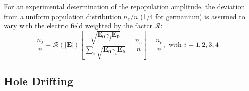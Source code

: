 For an experimental determination of the repopulation amplitude, the deviation from a uniform population distribution $n_{e}/n$ (1/4 for germanium) is assumed to vary with the electric field weighted by the factor $\mathcal{R}$:
\begin{equation}
  \label{eq:nion}
  \frac{n_{j}}{n} = \mathcal{R(|\mathbf{E}|)}   \left[         \frac{\sqrt{\mathbf{E_{0}}\gamma_{j}\mathbf{E_{0}}}}
    {\sum_{i}\sqrt{\mathbf{E_{0}}\gamma_{i}\mathbf{E_{0}}}} -               \frac{n_{e}}{n} \right] + \frac{n_{e}}{n},  \mbox{ with }           i=1,2,3,4
\end{equation}



\subsection{Hole Drifting}
\label{sec:hole}
